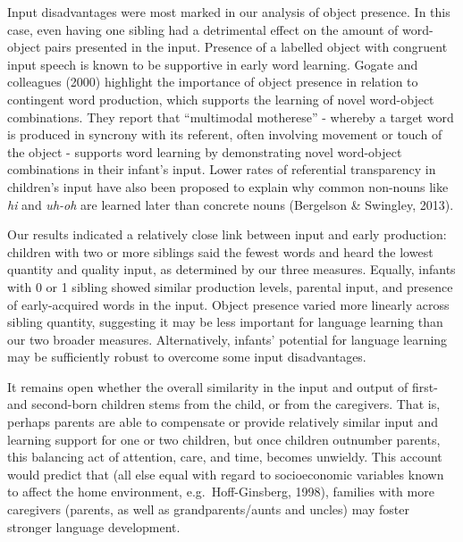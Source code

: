 \documentclass[
  english,
  man,floatsintext]{apa6}
\begin{document}
Input disadvantages were most marked in our analysis of object presence. In this case, even having one sibling had a detrimental effect on the amount of word-object pairs presented in the input. Presence of a labelled object with congruent input speech is known to be supportive in early word learning. Gogate and colleagues (2000) highlight the importance of object presence in relation to contingent word production, which supports the learning of novel word-object combinations. They report that \enquote{multimodal motherese} - whereby a target word is produced in syncrony with its referent, often involving movement or touch of the object - supports word learning by demonstrating novel word-object combinations in their infant's input. Lower rates of referential transparency in children's input have also been proposed to explain why common non-nouns like \emph{hi} and \emph{uh-oh} are learned later than concrete nouns (Bergelson \& Swingley, 2013).

Our results indicated a relatively close link between input and early production: children with two or more siblings said the fewest words and heard the lowest quantity and quality input, as determined by our three measures. Equally, infants with 0 or 1 sibling showed similar production levels, parental input, and presence of early-acquired words in the input. Object presence varied more linearly across sibling quantity, suggesting it may be less important for language learning than our two broader measures. Alternatively, infants' potential for language learning may be sufficiently robust to overcome some input disadvantages.

It remains open whether the overall similarity in the input and output of first- and second-born children stems from the child, or from the caregivers. That is, perhaps parents are able to compensate or provide relatively similar input and learning support for one or two children, but once children outnumber parents, this balancing act of attention, care, and time, becomes unwieldy. This account would predict that (all else equal with regard to socioeconomic variables known to affect the home environment, e.g.~Hoff-Ginsberg, 1998), families with more caregivers (parents, as well as grandparents/aunts and uncles) may foster stronger language development.
\end{document}
